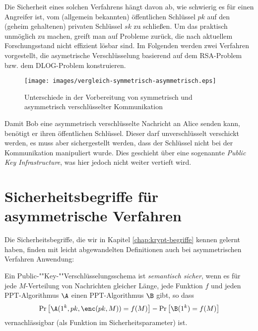 Die Sicherheit eines solchen Verfahrens hängt davon ab, wie schwierig es
für einen Angreifer ist, vom (allgemein bekannten) öffentlichen
Schlüssel $pk$ auf den (geheim gehaltenen) privaten Schlüssel $sk$ zu
schließen. Um das praktisch unmöglich zu machen, greift man auf Probleme
zurück, die nach aktuellem Forschungsstand nicht effizient lösbar
sind. Im Folgenden werden zwei Verfahren vorgestellt, die asymetrische
Verschlüsselung basierend auf dem RSA-Problem bzw. dem DLOG-Problem
konstruieren. 

\begin{figure}
\texttt{[image: images/vergleich-symmetrisch-asymmetrisch.eps]}
\caption{Unterschiede in der Vorbereitung von symmetrisch und
  asymmetrisch verschlüsselter Kommunikation}
\label{fig:asymmenc-symmenc}
\end{figure}
Damit Bob eine asymmetrisch verschlüsselte Nachricht an Alice senden
kann, benötigt er ihren öffentlichen Schlüssel. Dieser darf
unverschlüsselt verschickt werden, es muss aber sichergestellt werden,
dass der Schlüssel nicht bei der Kommunikation manipuliert wurde. Dies
geschieht über eine sogenannte \textit{Public Key Infrastructure}, was
hier jedoch nicht weiter vertieft wird.
\section{Sicherheitsbegriffe für asymmetrische Verfahren}
Die Sicherheitsbegriffe, die wir in Kapitel \ref{chap:krypt-begriffe}
kennen gelernt haben, finden mit leicht abgewandelten Definitionen auch
bei asymmetrischen Verfahren Anwendung:

\begin{definition}
Ein Pub\-lic-""Key-""Ver\-schlüs\-sel\-ungs\-sche\-ma ist \textit{semantisch sicher}, wenn es für jede $M$-Verteilung von Nachrichten gleicher Länge, jede
Funktion $f$ und jeden PPT-Algorithmus $\A$ einen PPT-Algorithmus $\B$ gibt, so dass
\begin{equation*}
\Pr\left[\A(1^k, pk, \enc(pk, M)) = f(M)\right] - \Pr\left[\B(1^k) = f(M)\right]
\end{equation*}
vernachlässigbar (als Funktion im Sicherheitsparameter) ist.
\end{definition}

